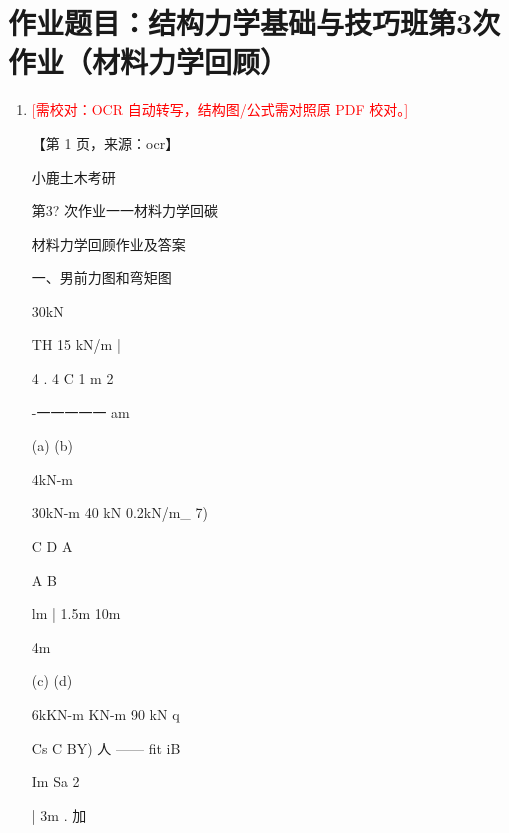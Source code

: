 \documentclass[UTF8,12pt,a4paper,openany]{ctexbook}
\newcommand{\TODO}[1]{\textcolor{red}{[需校对：#1]}}
\begin{document}
\section{作业题目：结构力学基础与技巧班第3次作业（材料力学回顾）}
\begin{enumerate}[label=\textbf{\arabic*.},leftmargin=2em]
\item \TODO{OCR 自动转写，结构图/公式需对照原 PDF 校对。}\par 【第 1 页，来源：ocr】\par 小鹿土木考研\par 第3? 次作业一一材料力学回碳\par 材料力学回顾作业及答案\par 一、男前力图和弯矩图\par 30kN\par TH                   15 kN/m |\par 4                    .     4            C   1 m   2\par -一一一一一        am\par (a)                         (b)\par 4kN-m\par 30kN-m           40 kN              0.2kN/m\_ 7)\par C        D         A\par A                                                B\par lm |        1.5m                10m\par 4m\par (c)                         (d)\par 6kKN-m KN-m 90 kN                             q\par Cs             C       BY)  人      —— fit     iB\par Im                       Sa        2\par |         3m                 .           加 
\end{enumerate}
\end{document}
